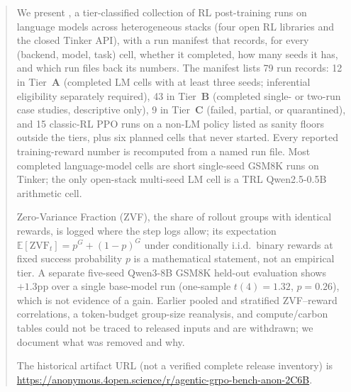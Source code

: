 \begin{abstract}
We present \ours{}, a tier-classified collection of RL post-training runs
on language models across heterogeneous stacks (four open RL libraries and
the closed Tinker API), with a run manifest that records, for every
(backend, model, task) cell, whether it completed, how many seeds it has,
and which run files back its numbers. The manifest lists 79 run records:
12 in Tier~\textbf{A} (completed LM cells with at least three seeds;
inferential eligibility separately required), 43 in Tier~\textbf{B}
(completed single- or two-run case studies, descriptive only), 9 in
Tier~\textbf{C} (failed, partial, or quarantined), and 15 classic-RL PPO
runs on a non-LM policy listed as sanity floors outside the tiers, plus six
planned cells that never started. Every reported training-reward number is recomputed from a named
run file. Most completed language-model cells are short single-seed GSM8K
runs on Tinker; the only open-stack multi-seed LM cell is a TRL
Qwen2.5-0.5B arithmetic cell.

Zero-Variance Fraction (ZVF), the share of rollout groups with identical
rewards, is logged where the step logs allow; its expectation
$\mathbb E[\mathrm{ZVF}_t]=p^{G}+(1{-}p)^{G}$ under conditionally i.i.d.\
binary rewards at fixed success probability $p$ is a mathematical statement,
not an empirical tier. A separate five-seed Qwen3-8B GSM8K held-out
evaluation shows $+1.3$pp over a single base-model run (one-sample
$t(4){=}1.32$, $p{=}0.26$), which is not evidence of a gain. Earlier
pooled and stratified ZVF--reward correlations, a token-budget group-size
reanalysis, and compute/carbon tables could not be traced to released
inputs and are withdrawn; we document what was removed and why.

The historical artifact URL (not a verified complete release inventory) is
\url{https://anonymous.4open.science/r/agentic-grpo-bench-anon-2C6B}.
\end{abstract}
